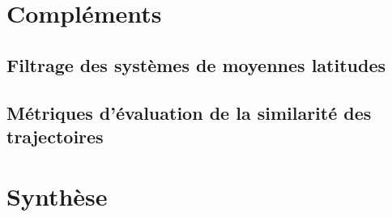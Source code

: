 \documentclass[../main.tex]{subfiles}
\begin{document}
\section{Compléments}

\subsection{Filtrage des systèmes de moyennes latitudes}\label{sec:filtrage_mid_latitudes}

\subsection{Métriques d'évaluation de la similarité des trajectoires}\label{sec:similarité}



\section{Synthèse}
\end{document}
